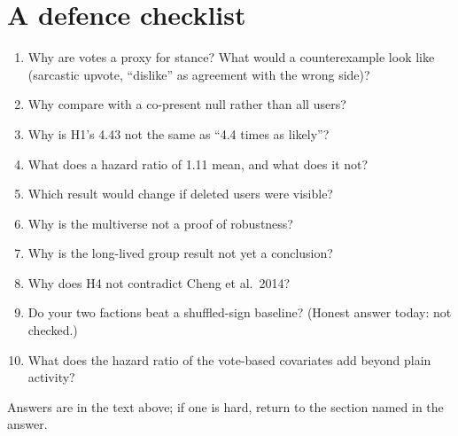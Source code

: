 \section{A defence checklist}
\begin{enumerate}
  \item Why are votes a proxy for stance? What would a counterexample look like (sarcastic upvote, ``dislike'' as agreement with the wrong side)?
  \item Why compare with a co-present null rather than all users?
  \item Why is H1's 4.43 not the same as ``4.4 times as likely''?
  \item What does a hazard ratio of 1.11 mean, and what does it not?
  \item Which result would change if deleted users were visible?
  \item Why is the multiverse not a proof of robustness?
  \item Why is the long-lived group result not yet a conclusion?
  \item Why does H4 not contradict Cheng et al.\ 2014?
  \item Do your two factions beat a shuffled-sign baseline? (Honest answer today: not checked.)
  \item What does the hazard ratio of the vote-based covariates add beyond plain activity?
\end{enumerate}
Answers are in the text above; if one is hard, return to the section named in the answer.
